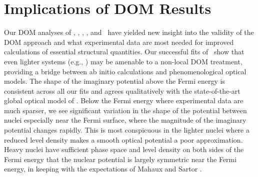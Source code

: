 \section{Implications of DOM Results}
Our DOM analyses of \oSixEight, \caAughtEight, \niEightFour, \snTwelveFour,
and \pbEight\ have yielded new insight into the validity of the DOM approach
and what experimental data are most needed for improved calculations of
essential structural quantities. Our successful fits of \oSixEight\ show that
even lighter systems (e.g., \cTwelve) may be amenable to a non-local DOM
treatment, providing a bridge between ab initio calculations and
phenomenological optical models. The shape of the imaginary potential
above the Fermi energy is consistent across all our fits and agrees
qualitatively with the state-of-the-art global optical model of \cite{KoningDelaroche}. 
Below the Fermi energy where experimental data are much sparser, we see
significant variation in the shape of the potential between nuclei especially
near the Fermi surface, where the magnitude of the imaginary potential changes
rapidly. This is most conspicuous in the lighter nuclei where a reduced level density
makes a smooth optical potential a poor approximation.
Heavy nuclei have sufficient phase space and level density on both
sides of the Fermi energy that the nuclear potential is largely symmetric near
the Fermi energy, in keeping with the expectations of Mahaux and Sartor \cite{Mahaux1991}.

